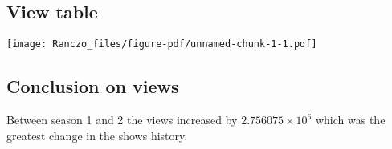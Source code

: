 \documentclass[
  letterpaper,
  DIV=11,
  numbers=noendperiod]{scrartcl}
\begin{document}
\hypertarget{view-table}{%
\subsection{View table}\label{view-table}}

\texttt{[image: Ranczo\_files/figure-pdf/unnamed-chunk-1-1.pdf]}

\hypertarget{conclusion-on-views}{%
\subsection{Conclusion on views}\label{conclusion-on-views}}

Between season 1 and 2 the views increased by
\ensuremath{2.756075\times 10^{6}} which was the greatest change in the
shows history.
\end{document}
